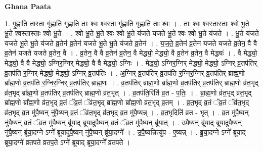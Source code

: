 \documentclass[17pt]{extarticle}
\begin{document}
\textbf{Ghana Paata } \newline

1. गृ॒ह्णा॒ति॒ तास्ता गृ॑ह्णाति गृह्णाति॒ ताः श्वः श्वस्ता गृ॑ह्णाति गृह्णाति॒ ताः श्वः । . ताः श्वः श्वस्तास्ताः श्वो भू॒ते भू॒ते श्वस्तास्ताः श्वो भू॒ते । . श्वो भू॒ते भू॒ते श्वः श्वो भू॒ते य॑जते यजते भू॒ते श्वः श्वो भू॒ते य॑जते । . भू॒ते य॑जते यजते भू॒ते भू॒ते य॑जते व्र॒तेन॑ व्र॒तेन॑ यजते भू॒ते भू॒ते य॑जते व्र॒तेन॑ । . य॒ज॒ते॒ व्र॒तेन॑ व्र॒तेन॑ यजते यजते व्र॒तेन॒ वै वै व्र॒तेन॑ यजते यजते व्र॒तेन॒ वै । . व्र॒तेन॒ वै वै व्र॒तेन॑ व्र॒तेन॒ वै मेद्ध्यो॒ मेद्ध्यो॒ वै व्र॒तेन॑ व्र॒तेन॒ वै मेद्ध्यः॑ । . वै मेद्ध्यो॒ मेद्ध्यो॒ वै वै मेद्ध्यो॒ ऽग्निर॒ग्निर् मेद्ध्यो॒ वै वै मेद्ध्यो॒ ऽग्निः । . मेद्ध्यो॒ ऽग्निर॒ग्निर् मेद्ध्यो॒ मेद्ध्यो॒ ऽग्निर् व्र॒तप॑तिर् व्र॒तप॑ति र॒ग्निर् मेद्ध्यो॒ मेद्ध्यो॒ ऽग्निर् व्र॒तप॑तिः । . अ॒ग्निर् व्र॒तप॑तिर् व्र॒तप॑ति र॒ग्निर॒ग्निर् व्र॒तप॑तिर् ब्राह्म॒णो ब्रा᳚ह्म॒णो व्र॒तप॑ति र॒ग्निर॒ग्निर् व्र॒तप॑तिर् ब्राह्म॒णः । . व्र॒तप॑तिर् ब्राह्म॒णो ब्रा᳚ह्म॒णो व्र॒तप॑तिर् व्र॒तप॑तिर् ब्राह्म॒णो व्र॑त॒भृद् व्र॑त॒भृद् ब्रा᳚ह्म॒णो व्र॒तप॑तिर् व्र॒तप॑तिर् ब्राह्म॒णो व्र॑त॒भृत् । . व्र॒तप॑ति॒रिति॑ व्र॒त - प॒तिः॒ । . ब्रा॒ह्म॒णो व्र॑त॒भृद् व्र॑त॒भृद् ब्रा᳚ह्म॒णो ब्रा᳚ह्म॒णो व्र॑त॒भृद् व्र॒तं ॅव्र॒तं ॅव्र॑त॒भृद् ब्रा᳚ह्म॒णो ब्रा᳚ह्म॒णो व्र॑त॒भृद् व्र॒तम् । . व्र॒त॒भृद् व्र॒तं ॅव्र॒तं ॅव्र॑त॒भृद् व्र॑त॒भृद् व्र॒त मु॑पै॒ष्यन् नु॑पै॒ष्यन् व्र॒तं ॅव्र॑त॒भृद् व्र॑त॒भृद् व्र॒त मु॑पै॒ष्यन्न् । . व्र॒त॒भृदिति॑ व्रत - भृत् । . व्र॒त मु॑पै॒ष्यन् नु॑पै॒ष्यन् व्र॒तं ॅव्र॒त मु॑पै॒ष्यन् ब्रू॑याद् ब्रूयादुपै॒ष्यन् व्र॒तं ॅव्र॒त मु॑पै॒ष्यन् ब्रू॑यात् । . उ॒पै॒ष्यन् ब्रू॑याद् ब्रूयादुपै॒ष्यन् नु॑पै॒ष्यन् ब्रू॑या॒दग्ने ऽग्ने᳚ ब्रूयादुपै॒ष्यन् नु॑पै॒ष्यन् ब्रू॑या॒दग्ने᳚ । . उ॒पै॒ष्यन्नित्यु॑प - ए॒ष्यन्न् । . ब्रू॒या॒दग्ने ऽग्ने᳚ ब्रूयाद् ब्रूया॒दग्ने᳚ व्रतपते व्रतप॒ते ऽग्ने᳚ ब्रूयाद् ब्रूया॒दग्ने᳚ व्रतपते । \newline
\end{document}
